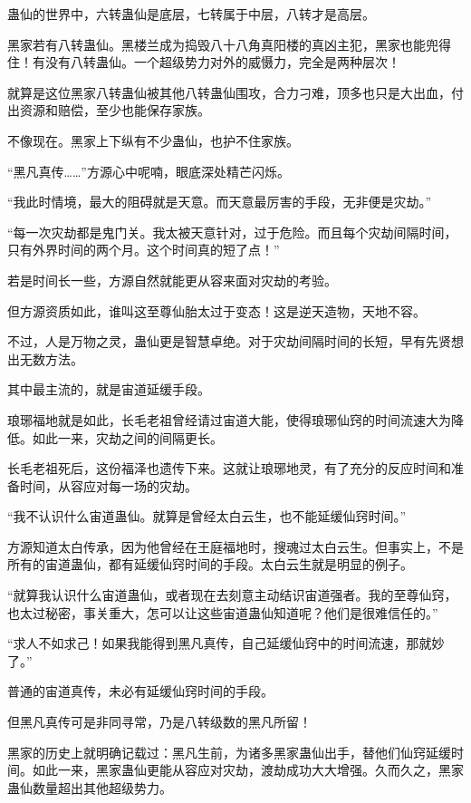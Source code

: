 \begin{this_body}
蛊仙的世界中，六转蛊仙是底层，七转属于中层，八转才是高层。

黑家若有八转蛊仙。黑楼兰成为捣毁八十八角真阳楼的真凶主犯，黑家也能兜得住！有没有八转蛊仙。一个超级势力对外的威慑力，完全是两种层次！

就算是这位黑家八转蛊仙被其他八转蛊仙围攻，合力刁难，顶多也只是大出血，付出资源和赔偿，至少也能保存家族。

不像现在。黑家上下纵有不少蛊仙，也护不住家族。

“黑凡真传……”方源心中呢喃，眼底深处精芒闪烁。

“我此时情境，最大的阻碍就是天意。而天意最厉害的手段，无非便是灾劫。”

“每一次灾劫都是鬼门关。我太被天意针对，过于危险。而且每个灾劫间隔时间，只有外界时间的两个月。这个时间真的短了点！”

若是时间长一些，方源自然就能更从容来面对灾劫的考验。

但方源资质如此，谁叫这至尊仙胎太过于变态！这是逆天造物，天地不容。

不过，人是万物之灵，蛊仙更是智慧卓绝。对于灾劫间隔时间的长短，早有先贤想出无数方法。

其中最主流的，就是宙道延缓手段。

琅琊福地就是如此，长毛老祖曾经请过宙道大能，使得琅琊仙窍的时间流速大为降低。如此一来，灾劫之间的间隔更长。

长毛老祖死后，这份福泽也遗传下来。这就让琅琊地灵，有了充分的反应时间和准备时间，从容应对每一场的灾劫。

“我不认识什么宙道蛊仙。就算是曾经太白云生，也不能延缓仙窍时间。”

方源知道太白传承，因为他曾经在王庭福地时，搜魂过太白云生。但事实上，不是所有的宙道蛊仙，都有延缓仙窍时间的手段。太白云生就是明显的例子。

“就算我认识什么宙道蛊仙，或者现在去刻意主动结识宙道强者。我的至尊仙窍，也太过秘密，事关重大，怎可以让这些宙道蛊仙知道呢？他们是很难信任的。”

“求人不如求己！如果我能得到黑凡真传，自己延缓仙窍中的时间流速，那就妙了。”

普通的宙道真传，未必有延缓仙窍时间的手段。

但黑凡真传可是非同寻常，乃是八转级数的黑凡所留！

黑家的历史上就明确记载过：黑凡生前，为诸多黑家蛊仙出手，替他们仙窍延缓时间。如此一来，黑家蛊仙更能从容应对灾劫，渡劫成功大大增强。久而久之，黑家蛊仙数量超出其他超级势力。


\end{this_body}
